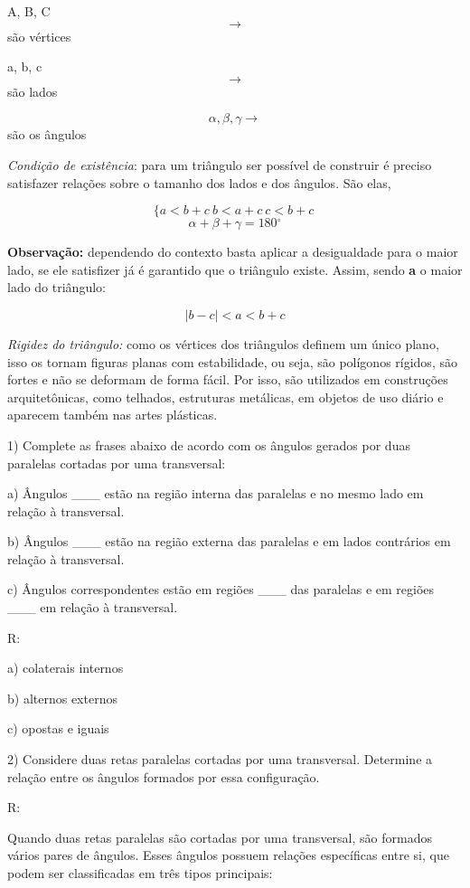 A, B, C \[\rightarrow\] são vértices

a, b, c \[\rightarrow\] são lados

\[\alpha,\beta,\gamma \rightarrow\] são os ângulos

\emph{Condição de existência}: para um triângulo ser possível de
construir é preciso satisfazer relações sobre o tamanho dos lados e dos
ângulos. São elas,

\[\{ a < b + c\ b < a + c\ c < b + c\ \]
\[\alpha + \beta + \gamma = 180{^\circ}\]

\textbf{Observação:} dependendo do contexto basta aplicar a desigualdade
para o maior lado, se ele satisfizer já é garantido que o triângulo
existe. Assim, sendo \textbf{{a}} o maior lado do triângulo:

\[\left| b - c \right| < a < b + c\]

\emph{Rigidez do triângulo:} como os vértices dos triângulos definem um
único plano, isso os tornam figuras planas com estabilidade, ou seja,
são polígonos rígidos, são fortes e não se deformam de forma fácil. Por
isso, são utilizados em construções arquitetônicas, como telhados,
estruturas metálicas, em objetos de uso diário e aparecem também nas
artes plásticas.


1) Complete as frases abaixo de acordo com os ângulos gerados por duas
paralelas cortadas por uma transversal:

a) Ângulos \_\_\_ estão na região interna das paralelas e no mesmo lado
em relação à transversal.

b) Ângulos \_\_\_ estão na região externa das paralelas e em lados
contrários em relação à transversal.

c) Ângulos correspondentes estão em regiões \_\_\_ das paralelas e em
regiões \_\_\_ em relação à transversal.

R:

a) colaterais internos

b) alternos externos

c) opostas e iguais

2) Considere duas retas paralelas cortadas por uma transversal.
Determine a relação entre os ângulos formados por essa configuração.

R:

Quando duas retas paralelas são cortadas por uma transversal, são
formados vários pares de ângulos. Esses ângulos possuem relações
específicas entre si, que podem ser classificadas em três tipos
principais:

